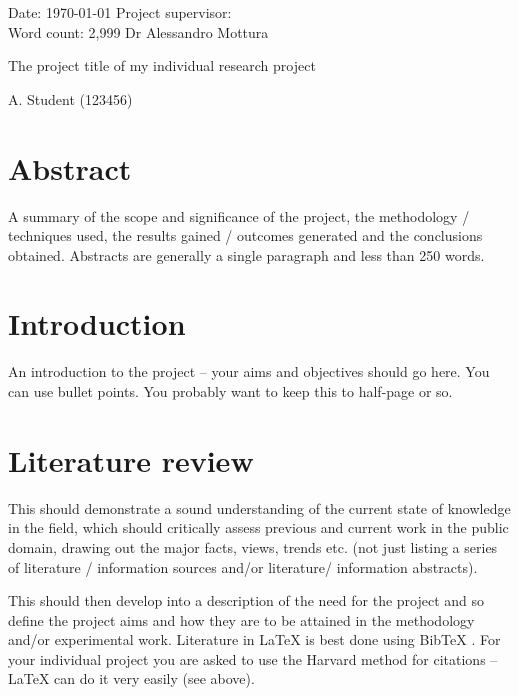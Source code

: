\documentclass[12pt, a4paper]{article}
\begin{document}
\onehalfspacing


Date: \today{}     \hfill{} Project supervisor: \\
Word count: 2,999   \hfill{} Dr Alessandro Mottura

{\LARGE The project title of my individual research project }

{\Large A. Student (123456)}

\vspace{0.4in}


\singlespacing
\tableofcontents



\onehalfspacing







\section{Abstract}
A summary of the scope and significance of the project, the methodology / techniques used, the results gained / outcomes generated and the conclusions obtained. Abstracts are generally a single paragraph and less than 250 words.




\section{Introduction}
An introduction to the project -- your aims and objectives should go here. You can use bullet points. You probably want to keep this to half-page or so.





\section{Literature review}
This should demonstrate a sound understanding of the current state of knowledge in the field, which should critically assess previous and current work in the public domain, drawing out the major facts, views, trends etc. (not just listing a series of literature / information sources and/or literature/ information abstracts). 

This should then develop into a description of the need for the project and so define the
project aims and how they are to be attained in the methodology and/or experimental work. Literature in \LaTeX{} \citep{ardell05} is best done using BibTeX \citep{ashbyjones, hk}. For your individual project you are asked to use the Harvard method for citations -- \LaTeX{} can do it very easily (see above).
\end{document}
